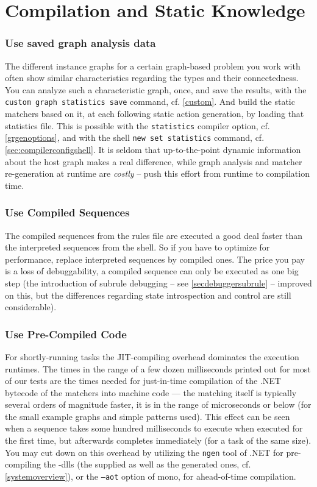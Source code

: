 
\section{Compilation and Static Knowledge}

\subsubsection*{Use saved graph analysis data}
The different instance graphs for a certain graph-based problem you work with often show similar characteristics regarding the types and their connectedness.
You can analyze such a characteristic graph, once, and save the results,
with the \texttt{custom graph statistics save} command, cf. \ref{custom}.
And build the static matchers based on it, at each following static action generation, by loading that statistics file. 
This is possible with the \texttt{statistics} compiler option, cf. \ref{grgenoptions},
and with the shell \texttt{new set statistics} command, cf. \ref{sec:compilerconfigshell}. 
It is seldom that up-to-the-point dynamic information about the host graph makes a real difference,
while graph analysis and matcher re-generation at runtime are \emph{costly} -- push this effort from runtime to compilation time.

\subsubsection*{Use Compiled Sequences}
The compiled sequences from the rules file are executed a good deal faster than the interpreted sequences from the shell.
So if you have to optimize for performance, replace interpreted sequences by compiled ones.
The price you pay is a loss of debuggability, a compiled sequence can only be executed as one big step 
(the introduction of subrule debugging -- see \ref{secdebuggersubrule} -- improved on this, but the differences regarding state introspection and control are still considerable).

\subsubsection*{Use Pre-Compiled Code}
For shortly-running tasks the JIT-compiling overhead dominates the execution runtimes.
The times in the range of a few dozen milliseconds printed out for most of our tests are the times needed for just-in-time compilation of the .NET bytecode of the matchers into machine code --- the matching itself is typically several orders of magnitude faster, it is in the range of microseconds or below (for the small example graphs and simple patterns used).
This effect can be seen when a sequence takes some hundred milliseconds to execute when executed for the first time, but afterwards completes immediately (for a task of the same size).
You may cut down on this overhead by utilizing the \texttt{ngen} tool of .NET for pre-compiling the \GrG-dlls (the supplied as well as the generated ones, cf. \ref{systemoverview}), or the \texttt{--aot} option of mono, for ahead-of-time compilation.


